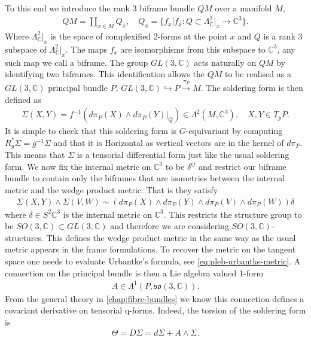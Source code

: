 \documentclass[10pt]{report}
\newcommand{\urb}[0]{Urbantke}
\theoremstyle{definition}
\newcommand{\C}[0]{\mathbb{C}}
\newcommand{\E}[0]{\C^3}
\begin{document}
To this end we introduce the rank 3 biframe bundle $QM$ over a manifold $M$,
\begin{align}
    QM = \coprod_{x\in M} Q_x, \quad Q_x = \{ \left. f_x \right| f_x : Q \subset \Lambda^2_\C|_x \rightarrow \E \}.
\end{align}
Where $\Lambda^2_\C |_x$ is the space of complexified 2-forms at the point $x$ and $Q$ is a rank 3 subspace of $\Lambda^2_\C |_x$. The maps $f_x$ are isomorphisms from this subspace to $\C^3$, any such map we call a biframe. The group $GL(3,\C)$ acts naturally on $QM$ by identifying two biframes. This identification allows the $QM$ to be realised as a $GL(3,\C)$ principal bundle $P$, $GL(3,\C) \hookrightarrow P \overset{\pi_P}{\rightarrow} M$. The soldering form is then defined as
\begin{align}
    \varSigma(X,Y) = f^{-1}(d\pi_P (X) \wedge d\pi_P(Y)|_Q) \in \Lambda^2(M,\E), \quad X,Y \in T_p P.
\end{align}
It is simple to check that this soldering form is $G$-equivariant by computing $R^*_g \varSigma = g^{-1} \varSigma$ and that it is Horizontal as vertical vectors are in the kernel of $d\pi_P$. This means that $\varSigma$ is a tensorial differential form just like the usual soldering form. We now fix the internal metric on $\C^3$ to be $\delta^{ij}$ and restrict our biframe bundle to contain only the biframes that are isometries between the internal metric and the wedge product metric. That is they satisfy
\begin{align}
    \varSigma(X,Y) \wedge \varSigma(V,W) \sim  (d\pi_P(X) \wedge d\pi_P(Y) \wedge d\pi_P(V) \wedge d\pi_P(W)) \delta
\end{align}
where $\delta \in S^2 \E$ is the internal metric on $\E$. This restricts the structure group to be $SO(3,\C) \subset GL(3,\C)$ and therefore we are considering $SO(3,\C)$-structures.
This defines the wedge product metric in the same way as the usual metric appears in the frame formulations. To recover the metric on the tangent space one needs to evaluate \urb{}'s formula, see \cref{eq:pleb-urbantke-metric}. A connection on the principal bundle is then a Lie algebra valued 1-form
\begin{align}
    A \in \Lambda^1(P,\mathfrak{so}(3,\C)).
\end{align}
From the general theory in \cref{chap:fibre-bundles} we know this connection defines a covariant derivative on tensorial q-forms. Indeed, the torsion of the soldering form is
\begin{align}
    \Theta = D \varSigma = d \varSigma + A \wedge \varSigma.
\end{align}
\end{document}
